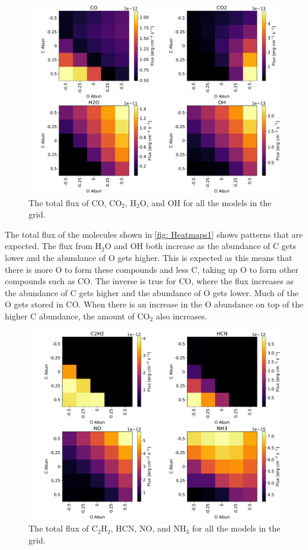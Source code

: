 \documentclass[twoside, single, authoryear, semicolon, 12pt]{lion-msc}
\newcommand{\4}{$_4$}
\newcommand{\3}{$_3$}
\newcommand{\2}{$_2$}
\begin{document}
\begin{figure}[H]
    \centering
    \includegraphics[width=\linewidth]{Figures/Heatmaps1.pdf}
    \caption{The total flux of CO, CO\2, H\2O, and OH for all the models in the grid.}
    \label{fig: Heatmaps1}
\end{figure}

The total flux of the molecules shown in \autoref{fig: Heatmaps1} shows patterns that are expected. The flux from H\2O and OH both increase as the abundance of C gets lower and the abundance of O gets higher. This is expected as this means that there is more O to form these compounds and less C, taking up O to form other compounds such as CO. The inverse is true for CO, where the flux increases as the abundance of C gets higher and the abundance of O gets lower. Much of the O gets stored in CO. When there is an increase in the O abundance on top of the higher C abundance, the amount of CO\2 also increases. 

\begin{figure}[H]
    \centering
    \includegraphics[width=\linewidth]{Figures/Heatmaps2.pdf}
    \caption{The total flux of C\2H\2, HCN, NO, and NH\3 for all the models in the grid.}
    \label{fig: Heatmaps2}
\end{figure}
\end{document}
